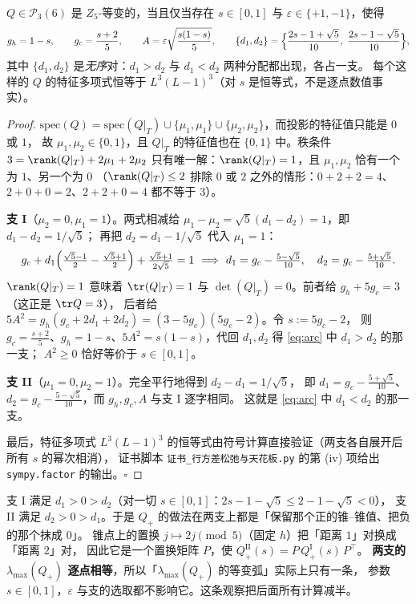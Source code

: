 \begin{lemma}[$Z_5$-等变秩三投影的完全分类，已证]\label{lem:z5class}
$Q\in\mathcal P_3(6)$ 是 $Z_5$-等变的，当且仅当存在 $s\in[0,1]$ 与 $\varepsilon\in\{+1,-1\}$，使得
\begin{equation}\label{eq:arc}
g_h=1-s,\qquad g_c=\frac{s+2}5,\qquad A=\varepsilon\sqrt{\frac{s(1-s)}5},\qquad
\{d_1,d_2\}=\Bigl\{\frac{2s-1+\sqrt5}{10},\ \frac{2s-1-\sqrt5}{10}\Bigr\},
\end{equation}
其中 $\{d_1,d_2\}$ 是\emph{无序}对：$d_1>d_2$ 与 $d_1<d_2$ 两种分配都出现，各占一支。
每个这样的 $Q$ 的特征多项式恒等于 $L^3(L-1)^3$（对 $s$ 是恒等式，不是逐点数值事实）。
\end{lemma}

\begin{proof}
$\mathrm{spec}(Q)=\mathrm{spec}(Q|_T)\cup\{\mu_1,\mu_1\}\cup\{\mu_2,\mu_2\}$，而投影的特征值只能是 $0$ 或 $1$，
故 $\mu_1,\mu_2\in\{0,1\}$，且 $Q|_T$ 的特征值也在 $\{0,1\}$ 中。秩条件
$3=\rank(Q|_T)+2\mu_1+2\mu_2$ 只有唯一解：$\rank(Q|_T)=1$，且 $\mu_1,\mu_2$ 恰有一个为 $1$、另一个为 $0$
（$\rank(Q|_T)\le2$ 排除 $0$ 或 $2$ 之外的情形：$0+2+2=4$、$2+0+0=2$、$2+2+0=4$ 都不等于 $3$）。

\textbf{支 I}（$\mu_2=0,\mu_1=1$）。两式相减给 $\mu_1-\mu_2=\sqrt5(d_1-d_2)=1$，即 $d_1-d_2=1/\sqrt5$；
再把 $d_2=d_1-1/\sqrt5$ 代入 $\mu_1=1$：
\[
g_c+d_1\Bigl(\tfrac{\sqrt5-1}2-\tfrac{\sqrt5+1}2\Bigr)+\tfrac{\sqrt5+1}{2\sqrt5}=1
\ \Longrightarrow\ d_1=g_c-\tfrac{5-\sqrt5}{10},\quad d_2=g_c-\tfrac{5+\sqrt5}{10}.
\]
$\rank(Q|_T)=1$ 意味着 $\tr(Q|_T)=1$ 与 $\det(Q|_T)=0$。前者给 $g_h+5g_c=3$（这正是 $\tr Q=3$），
后者给 $5A^2=g_h(g_c+2d_1+2d_2)=(3-5g_c)(5g_c-2)$。令 $s:=5g_c-2$，
则 $g_c=\frac{s+2}5$、$g_h=1-s$、$5A^2=s(1-s)$，代回 $d_1,d_2$ 得 \eqref{eq:arc} 中 $d_1>d_2$ 的那一支；
$A^2\ge0$ 恰好等价于 $s\in[0,1]$。

\textbf{支 II}（$\mu_1=0,\mu_2=1$）。完全平行地得到 $d_2-d_1=1/\sqrt5$，
即 $d_1=g_c-\frac{5+\sqrt5}{10}$、$d_2=g_c-\frac{5-\sqrt5}{10}$，而 $g_h,g_c,A$ 与支 I 逐字相同。
这就是 \eqref{eq:arc} 中 $d_1<d_2$ 的那一支。

最后，特征多项式 $L^3(L-1)^3$ 的恒等式由符号计算直接验证（两支各自展开后所有 $s$ 的幂次相消），
证书脚本 \texttt{证书\_行方差松弛与天花板.py} 的第 (iv) 项给出 \texttt{sympy.factor} 的输出。$\square$
\end{proof}

\begin{remark}[两支在正部意义下是同一条弧]\label{rmk:twobranch}
支 I 满足 $d_1>0>d_2$（对一切 $s\in[0,1]$：$2s-1-\sqrt5\le2-1-\sqrt5<0$），
支 II 满足 $d_2>0>d_1$。于是 $Q_+$ 的做法在两支上都是「保留那个正的锥--锥值、把负的那个抹成 $0$」。
锥点上的置换 $j\mapsto 2j\pmod 5$（固定 $h$）把「距离 $1$」对换成「距离 $2$」对，
因此它是一个置换矩阵 $P$，使 $Q_+^{\mathrm{II}}(s)=P\,Q_+^{\mathrm{I}}(s)\,P^\top$。
\textbf{两支的 $\lambda_{\max}(Q_+)$ 逐点相等}，所以「$\lambda_{\max}(Q_+)$ 的等变弧」实际上只有一条，
参数 $s\in[0,1]$，$\varepsilon$ 与支的选取都不影响它。这条观察把后面所有计算减半。
\end{remark}

